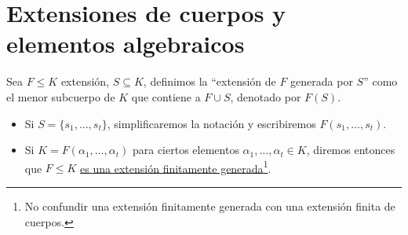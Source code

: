 \section{Extensiones de cuerpos y elementos algebraicos}

\begin{definicion}
    Sea $F\leq K$ extensión, $S\subseteq K$, definimos la ``extensión de $F$ generada por $S$'' como el menor subcuerpo de $K$ que contiene a $F\cup S$, denotado por $F(S)$.
    \begin{itemize}
        \item Si $S = \{s_1,\ldots,s_t\}$, simplificaremos la notación y escribiremos $F(s_1,\ldots,s_t)$.
        \item Si $K = F(\alpha_1, \ldots, \alpha_t)$ para ciertos elementos $\alpha_1, \ldots, \alpha_t\in K$, diremos entonces que $F\leq K$ \underline{es una extensión finitamente generada}\footnote{No confundir una extensión finitamente generada con una extensión finita de cuerpos.}.
    \end{itemize}
\end{definicion}

